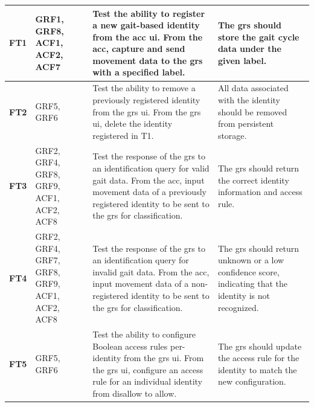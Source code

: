 \begin{scriptsize}
\begin{longtable}{|p{}|p{}|p{}|p{}|}
        \endhead
        \hline
        \endfoot
        \textbf{FT1}  & GRF1, GRF8, ACF1, ACF2, ACF7                   & Test the ability to register a new gait-based identity from the \ac{acc} \ac{ui}. From the \ac{acc}, capture and send movement data to the \ac{grs} with a specified label.                                                                                                                                                   & The \ac{grs} should store the gait cycle data under the given label.                                                                         \\ \hline
        \textbf{FT2}  & GRF5, GRF6                                     & Test the ability to remove a previously registered identity from the \ac{grs} \ac{ui}. From the \ac{grs} \ac{ui}, delete the identity registered in T1.                                                                                                                                                                       & All data associated with the identity should be removed from persistent storage.                                                             \\ \hline
        \textbf{FT3}  & GRF2, GRF4, GRF8, GRF9, ACF1, ACF2, ACF8       & Test the response of the \ac{grs} to an identification query for valid gait data. From the \ac{acc}, input movement data of a previously registered identity to be sent to the \ac{grs} for classification.                                                                                                                   & The \ac{grs} should return the correct identity information and access rule.                                                                 \\ \hline
        \textbf{FT4}  & GRF2, GRF4, GRF7, GRF8, GRF9, ACF1, ACF2, ACF8 & Test the response of the \ac{grs} to an identification query for invalid gait data. From the \ac{acc}, input movement data of a non-registered identity to be sent to the \ac{grs} for classification.                                                                                                                        & The \ac{grs} should return unknown or a low confidence score, indicating that the identity is not recognized.                                \\ \hline
        \textbf{FT5}  & GRF5, GRF6                                     & Test the ability to configure Boolean access rules per-identity from the \ac{grs} \ac{ui}. From the \ac{grs} \ac{ui}, configure an access rule for an individual identity from disallow to allow.                                                                                                                             & The \ac{grs} should update the access rule for the identity to match the new configuration.                                                  \\ \hline

\end{longtable}
\end{scriptsize}
